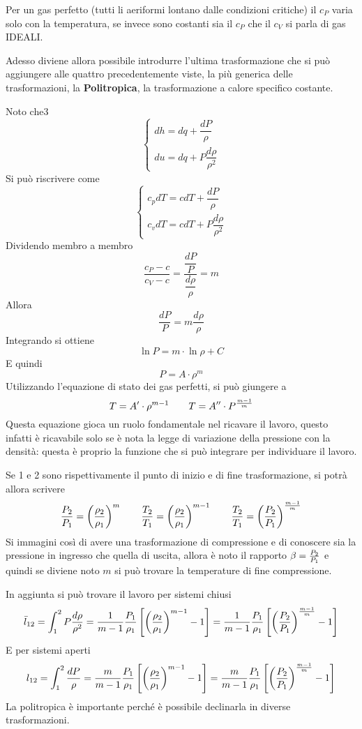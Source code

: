 \begin{adjustwidth}{2in}{}
	Per un gas perfetto (tutti li aeriformi lontano dalle condizioni critiche) il $c_P$ varia solo con la temperatura, se invece sono costanti sia il $c_P$ che il $c_V$ si parla di gas IDEALI. \newline
	
	Adesso diviene allora possibile introdurre l'ultima trasformazione che si può aggiungere alle quattro precedentemente viste, la più generica delle trasformazioni, la \textbf{Politropica}, la trasformazione a calore specifico costante.
	
	Noto che3  
	\[\begin{cases}
		dh = dq + \dfrac{dP}{\rho} \\ du = dq + P\dfrac{d\rho}{\rho^2} 
	\end{cases}\]
	Si può riscrivere come 
	\[\begin{cases}
		c_pdT = cdT + \dfrac{dP}{\rho} \\ c_vdT = cdT + P\dfrac{d\rho}{\rho^2}
	\end{cases}\]
	Dividendo membro a membro
	\begin{equation}\label{eq:1.17}
		\dfrac{c_P-c}{c_V-c} = \dfrac{\dfrac{dP}{P}}{\dfrac{d\rho}{\rho}}=m
	\end{equation}
	Allora 
	\[\dfrac{dP}{P} = m\dfrac{d\rho}{\rho}\]
	Integrando si ottiene 
	\[\ln P = m\cdot\ln\rho + C\]
	E quindi
	\[P = A\cdot\rho^m\]
	Utilizzando l'equazione di stato dei gas perfetti, si può giungere a
	\[T = A'\cdot\rho^{m-1} \qquad T = A''\cdot P^{m-1\over m}\]
	Questa equazione gioca un ruolo fondamentale nel ricavare il lavoro, questo infatti è ricavabile solo se è nota la legge di variazione della pressione con la densità: questa è proprio la funzione che si può integrare per individuare il lavoro. 
	
	Se 1 e 2 sono rispettivamente il punto di inizio e di fine trasformazione, si potrà allora scrivere 
	\[\dfrac{P_2}{P_1} = \left(\dfrac{\rho_2}{\rho_1}\right)^m \qquad \dfrac{T_2}{T_1} = \left(\dfrac{\rho_2}{\rho_1}\right)^{m-1} \qquad \dfrac{T_2}{T_1} = \left(\dfrac{P_2}{P_1}\right)^{m-1\over m}\]
	Si immagini così di avere una trasformazione di compressione e di conoscere sia la pressione in ingresso che quella di uscita, allora è noto il rapporto $\beta={P_2\over P_1}$ e quindi se diviene noto $m$ si può trovare la temperature di fine compressione. \newline
	
	In aggiunta si può trovare il lavoro per sistemi chiusi
	\[\bar{l}_{12} = \int_{1}^{2}P\dfrac{d\rho}{\rho^2} = \dfrac{1}{m-1}\dfrac{P_1}{\rho_1}\left[\left(\dfrac{\rho_2}{\rho_1}\right)^{m-1}-1\right] = \dfrac{1}{m-1}\dfrac{P_1}{\rho_1}\left[\left(\dfrac{P_2}{P_1}\right)^{m-1\over m}-1\right]\]
	E per sistemi aperti
	\[l_{12} = \int_{1}^{2}\dfrac{dP}{\rho} = \dfrac{m}{m-1}\dfrac{P_1}{\rho_1}\left[\left(\dfrac{\rho_2}{\rho_1}\right)^{m-1}-1\right] = \dfrac{m}{m-1}\dfrac{P_1}{\rho_1}\left[\left(\dfrac{P_2}{P_1}\right)^{m-1\over m}-1\right]\]
	La politropica è importante perché è possibile declinarla in diverse trasformazioni.
	\begin{itemize}
		

\end{itemize}
\end{adjustwidth}
